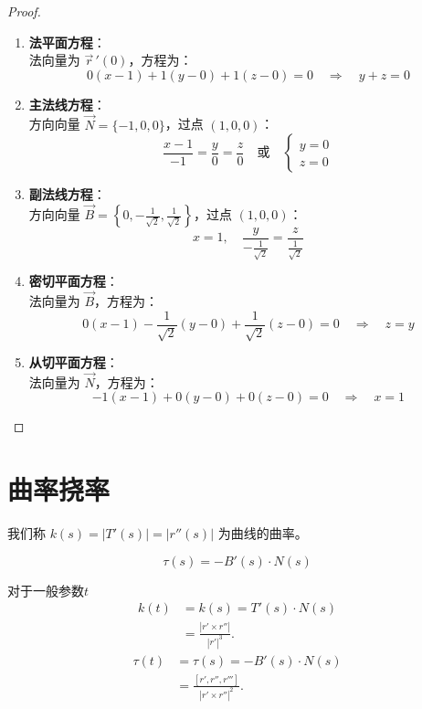 \documentclass[lang=cn,10pt,thmcnt=section]{elegantbook}
\begin{document}
\begin{proof}
\begin{enumerate}
\begin{enumerate}
			\item \textbf{法平面方程}：\\
			法向量为 $\vec{r}\,'(0)$，方程为：
			\[
				0(x-1) + 1(y-0) + 1(z-0) = 0 \quad \Rightarrow \quad y + z = 0
			\]
			
			\item \textbf{主法线方程}：\\
			方向向量 $\vec{N} = \{-1, 0, 0\}$，过点 $(1, 0, 0)$：
			\[
				\frac{x-1}{-1} = \frac{y}{0} = \frac{z}{0} \quad \text{或} \quad 
				\begin{cases} 
					y = 0 \\ 
					z = 0 
				\end{cases}
			\]
			
			\item \textbf{副法线方程}：\\
			方向向量 $\vec{B} = \left\{0, -\frac{1}{\sqrt{2}}, \frac{1}{\sqrt{2}}\right\}$，过点 $(1, 0, 0)$：
			\[
				x = 1, \quad \frac{y}{-\frac{1}{\sqrt{2}}} = \frac{z}{\frac{1}{\sqrt{2}}}
			\]
			
			\item \textbf{密切平面方程}：\\
			法向量为 $\vec{B}$，方程为：
			\[
				0(x-1) -\frac{1}{\sqrt{2}}(y-0) + \frac{1}{\sqrt{2}}(z-0) = 0 \quad \Rightarrow \quad z = y
			\]
			
			\item \textbf{从切平面方程}：\\
			法向量为 $\vec{N}$，方程为：
			\[
				-1(x-1) + 0(y-0) + 0(z-0) = 0 \quad \Rightarrow \quad x = 1
			\]
		\end{enumerate}
	\end{enumerate}
\end{proof}
\section{曲率挠率}
\begin{definition}[曲率]
    我们称 $k(s) = |T'(s)| = |r''(s)|$ 为曲线的曲率。
\end{definition}
\begin{definition}[挠率]
    \[
    \tau(s) = -B'(s) \cdot N(s)
    \]
\end{definition}
对于一般参数$t$
\begin{align*}
    k(t) &= k(s) = T'(s) \cdot N(s) \\
     &= \frac{|r' \times r''|}{|r'|^3}.
\end{align*}
\begin{align*}
    \tau(t) &= \tau(s) = -B'(s) \cdot N(s)\\
    &= \frac{[r', r'', r''']}{|r' \times r''|^2}.
\end{align*} 
\end{document}
